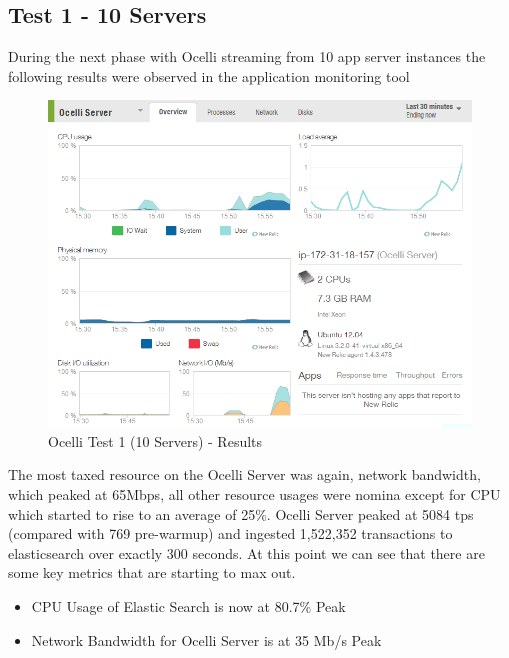 \documentclass{llncs}
\begin{document}
\subsection{Test 1 - 10 Servers}

During the next phase with Ocelli streaming from 10 app server instances the following results were observed in the application monitoring tool

\begin{figure}[h]
    \centering
    \includegraphics[scale=0.7]{app6}
    \caption{Ocelli Test 1 (10 Servers) - Results}
    \label{fig:ocelli_dm}
\end{figure}

The most taxed resource on the Ocelli Server was again, network bandwidth, which peaked at 65Mbps, all other resource usages were nomina except for CPU which started to rise to an average of 25\%. Ocelli Server peaked at 5084 tps (compared with 769 pre-warmup) and ingested 1,522,352 transactions to elasticsearch over exactly 300 seconds. At this point we can see that there are some key metrics that are starting to max out.

\begin{itemize}
\item CPU Usage of Elastic Search is now at 80.7\% Peak
\item Network Bandwidth for Ocelli Server is at 35 Mb/s Peak
\end{itemize}
\end{document}
